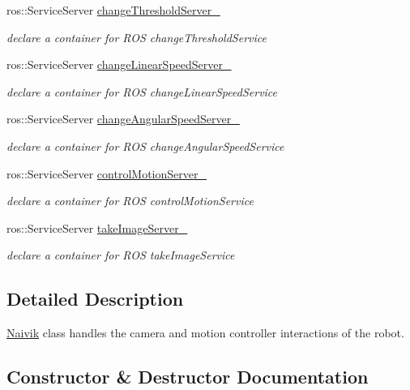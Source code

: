 \begin{DoxyCompactItemize}
ros\+::\+Service\+Server \hyperlink{classNaivik_a7792b0bfe36fe70c679971470b4cc649}{change\+Threshold\+Server\+\_\+}
\begin{DoxyCompactList}\small\item\em declare a container for R\+OS change\+Threshold\+Service \end{DoxyCompactList}\item 
ros\+::\+Service\+Server \hyperlink{classNaivik_a350e4f31ff9ef9e62b2d4b6c9df6fb23}{change\+Linear\+Speed\+Server\+\_\+}
\begin{DoxyCompactList}\small\item\em declare a container for R\+OS change\+Linear\+Speed\+Service \end{DoxyCompactList}\item 
ros\+::\+Service\+Server \hyperlink{classNaivik_a6ead6207d0ce5ef49caa1ad8d1d1fcaa}{change\+Angular\+Speed\+Server\+\_\+}
\begin{DoxyCompactList}\small\item\em declare a container for R\+OS change\+Angular\+Speed\+Service \end{DoxyCompactList}\item 
ros\+::\+Service\+Server \hyperlink{classNaivik_a89a480a5925204ab179dfe0717e26436}{control\+Motion\+Server\+\_\+}
\begin{DoxyCompactList}\small\item\em declare a container for R\+OS control\+Motion\+Service \end{DoxyCompactList}\item 
ros\+::\+Service\+Server \hyperlink{classNaivik_a158e6056518bf811c8aab30f2341e0c6}{take\+Image\+Server\+\_\+}
\begin{DoxyCompactList}\small\item\em declare a container for R\+OS take\+Image\+Service \end{DoxyCompactList}\end{DoxyCompactItemize}


\subsection{Detailed Description}
\hyperlink{classNaivik}{Naivik} class handles the camera and motion controller interactions of the robot. 

\subsection{Constructor \& Destructor Documentation}
